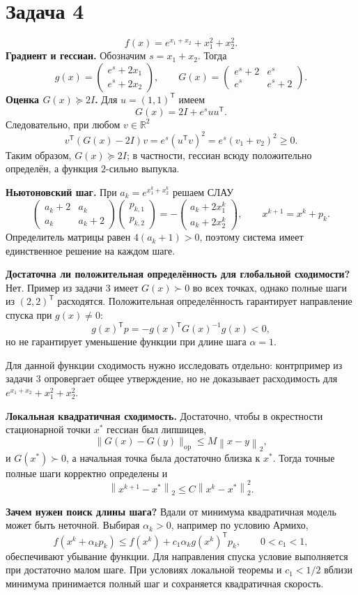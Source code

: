 \documentclass[12pt,a4paper]{article}
\newcommand{\R}{\mathbb R}
\newcommand{\T}{^{\mathsf T}}
\newcommand{\norm}[1]{\left\lVert#1\right\rVert_2}
\begin{document}
\section*{Задача 4}
\[
f(x)=e^{x_1+x_2}+x_1^2+x_2^2.
\]
\textbf{Градиент и гессиан.} Обозначим $s=x_1+x_2$. Тогда
\[
g(x)=\begin{pmatrix}e^s+2x_1\\e^s+2x_2\end{pmatrix},\qquad
G(x)=\begin{pmatrix}e^s+2&e^s\\e^s&e^s+2\end{pmatrix}.
\]
\textbf{Оценка $G(x)\succeq2I$.} Для $u=(1,1)\T$ имеем
\[
G(x)=2I+e^suu\T.
\]
Следовательно, при любом $v\in\R^2$
\[
v\T(G(x)-2I)v=e^s(u\T v)^2=e^s(v_1+v_2)^2\ge0.
\]
Таким образом, $G(x)\succeq2I$; в частности, гессиан всюду положительно определён, а функция $2$-сильно выпукла.

\textbf{Ньютоновский шаг.} При $a_k=e^{x_1^k+x_2^k}$ решаем СЛАУ
\[
\begin{pmatrix}a_k+2&a_k\\a_k&a_k+2\end{pmatrix}
\begin{pmatrix}p_{k,1}\\p_{k,2}\end{pmatrix}
=-\begin{pmatrix}a_k+2x_1^k\\a_k+2x_2^k\end{pmatrix},\qquad
x^{k+1}=x^k+p_k.
\]
Определитель матрицы равен $4(a_k+1)>0$, поэтому система имеет единственное решение на каждом шаге.

\textbf{Достаточна ли положительная определённость для глобальной сходимости?}
Нет. Пример из задачи 3 имеет $G(x)\succ0$ во всех точках, однако полные шаги из $(2,2)\T$ расходятся. Положительная определённость гарантирует направление спуска при $g(x)\ne0$:
\[
g(x)\T p=-g(x)\T G(x)^{-1}g(x)<0,
\]
но не гарантирует уменьшение функции при длине шага $\alpha=1$.

Для данной функции сходимость нужно исследовать отдельно: контрпример из задачи 3 опровергает общее утверждение, но не доказывает расходимость для $e^{x_1+x_2}+x_1^2+x_2^2$.

\textbf{Локальная квадратичная сходимость.} Достаточно, чтобы в окрестности стационарной точки $x^*$ гессиан был липшицев,
\[
\|G(x)-G(y)\|_{\mathrm{op}}\le M\norm{x-y},
\]
и $G(x^*)\succ0$, а начальная точка была достаточно близка к $x^*$. Тогда точные полные шаги корректно определены и
\[
\norm{x^{k+1}-x^*}\le C\norm{x^k-x^*}^2.
\]


\textbf{Зачем нужен поиск длины шага?} Вдали от минимума квадратичная модель может быть неточной. Выбирая $\alpha_k>0$, например по условию Армихо,
\[
f(x^k+\alpha_kp_k)\le f(x^k)+c_1\alpha_k g(x^k)\T p_k,\qquad 0<c_1<1,
\]
обеспечивают убывание функции. Для направления спуска условие выполняется при достаточно малом шаге. При условиях локальной теоремы и $c_1<1/2$ вблизи минимума принимается полный шаг и сохраняется квадратичная скорость.
\end{document}
